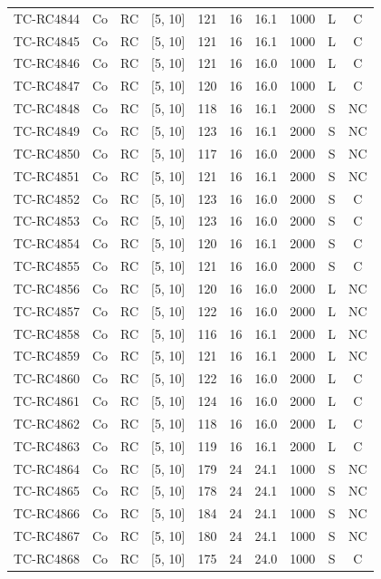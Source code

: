 \begin{longtable}{lccccccccc}
TC-RC4844 & Co & RC & [5, 10] & 121 & 16 & 16.1 & 1000 & L & C \\
TC-RC4845 & Co & RC & [5, 10] & 121 & 16 & 16.1 & 1000 & L & C \\
TC-RC4846 & Co & RC & [5, 10] & 121 & 16 & 16.0 & 1000 & L & C \\
TC-RC4847 & Co & RC & [5, 10] & 120 & 16 & 16.0 & 1000 & L & C \\
TC-RC4848 & Co & RC & [5, 10] & 118 & 16 & 16.1 & 2000 & S & NC \\
TC-RC4849 & Co & RC & [5, 10] & 123 & 16 & 16.1 & 2000 & S & NC \\
TC-RC4850 & Co & RC & [5, 10] & 117 & 16 & 16.0 & 2000 & S & NC \\
TC-RC4851 & Co & RC & [5, 10] & 121 & 16 & 16.1 & 2000 & S & NC \\
TC-RC4852 & Co & RC & [5, 10] & 123 & 16 & 16.0 & 2000 & S & C \\
TC-RC4853 & Co & RC & [5, 10] & 123 & 16 & 16.0 & 2000 & S & C \\
TC-RC4854 & Co & RC & [5, 10] & 120 & 16 & 16.1 & 2000 & S & C \\
TC-RC4855 & Co & RC & [5, 10] & 121 & 16 & 16.0 & 2000 & S & C \\
TC-RC4856 & Co & RC & [5, 10] & 120 & 16 & 16.0 & 2000 & L & NC \\
TC-RC4857 & Co & RC & [5, 10] & 122 & 16 & 16.0 & 2000 & L & NC \\
TC-RC4858 & Co & RC & [5, 10] & 116 & 16 & 16.1 & 2000 & L & NC \\
TC-RC4859 & Co & RC & [5, 10] & 121 & 16 & 16.1 & 2000 & L & NC \\
TC-RC4860 & Co & RC & [5, 10] & 122 & 16 & 16.0 & 2000 & L & C \\
TC-RC4861 & Co & RC & [5, 10] & 124 & 16 & 16.0 & 2000 & L & C \\
TC-RC4862 & Co & RC & [5, 10] & 118 & 16 & 16.0 & 2000 & L & C \\
TC-RC4863 & Co & RC & [5, 10] & 119 & 16 & 16.1 & 2000 & L & C \\
TC-RC4864 & Co & RC & [5, 10] & 179 & 24 & 24.1 & 1000 & S & NC \\
TC-RC4865 & Co & RC & [5, 10] & 178 & 24 & 24.1 & 1000 & S & NC \\
TC-RC4866 & Co & RC & [5, 10] & 184 & 24 & 24.1 & 1000 & S & NC \\
TC-RC4867 & Co & RC & [5, 10] & 180 & 24 & 24.1 & 1000 & S & NC \\
TC-RC4868 & Co & RC & [5, 10] & 175 & 24 & 24.0 & 1000 & S & C \\

\end{longtable}
